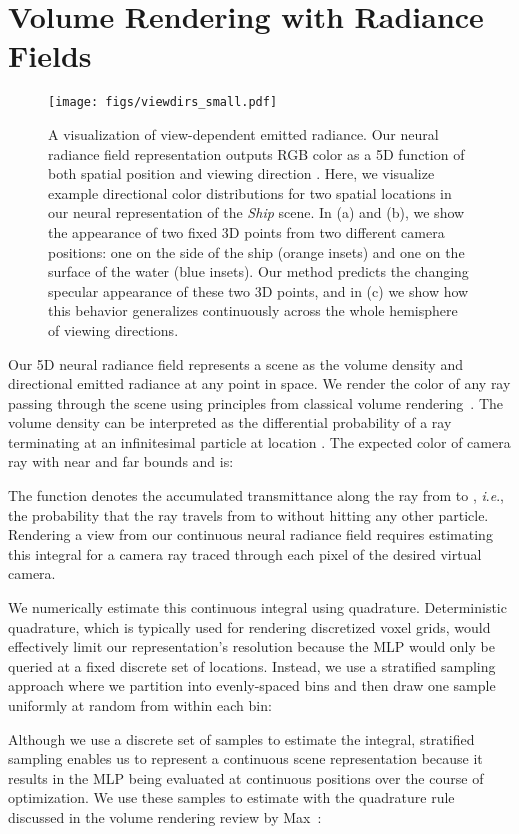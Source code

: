 \documentclass[runningheads]{llncs}
\newcommand{\ie}{\textit{i}.\textit{e}., }
\newcommand{\scenename}[1]{\textit{#1}}
\begin{document}
\section{Volume Rendering with Radiance Fields}
\label{sec:rendering}

\begin{figure}[t]
\centering
\texttt{[image: figs/viewdirs\_small.pdf]}
\caption{A visualization of view-dependent emitted radiance. Our neural radiance field representation outputs RGB color as a 5D function of both spatial position  and viewing direction . Here, we visualize example directional color distributions for two spatial locations in our neural representation of the \scenename{Ship} scene. 
In (a) and (b), we show the appearance of two fixed 3D points from two different camera positions: one on the side of the ship (orange insets) and one on the surface of the water (blue insets).
Our method predicts the changing specular appearance of these two 3D points, and in (c) we show how this behavior generalizes continuously across the whole hemisphere of viewing directions.
}
\label{fig:viewdirs}
\end{figure}


Our 5D neural radiance field represents a scene as the volume density and directional emitted radiance at any point in space. We render the color of any ray passing through the scene using principles from classical volume rendering~\cite{kajiya84}. The volume density  can be interpreted as the differential probability of a ray terminating at an infinitesimal particle at location . The expected color  of camera ray  with near and far bounds  and  is: 

The function  denotes the accumulated transmittance along the ray from  to , \ie the probability that the ray travels from  to  without hitting any other particle. Rendering a view from our continuous neural radiance field requires estimating this integral  for a camera ray traced through each pixel of the desired virtual camera.

We numerically estimate this continuous integral using quadrature. Deterministic quadrature, which is typically used for rendering discretized voxel grids, would effectively limit our representation's resolution because the MLP would only be queried at a fixed discrete set of locations. Instead, we use a stratified sampling approach where we partition  into  evenly-spaced bins and then draw one sample uniformly at random from within each bin:
 
Although we use a discrete set of samples to estimate the integral, stratified sampling enables us to represent a continuous scene representation because it results in the MLP being evaluated at continuous positions over the course of optimization. We use these samples to estimate  with the quadrature rule discussed in the volume rendering review by Max~\cite{max95}:
\end{document}
